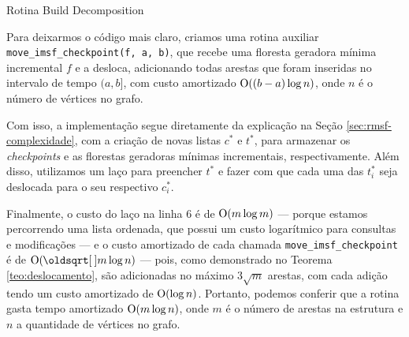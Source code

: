 \begin{algorithm}[h!]
    \caption{Rotina Build Decomposition}\label{rmsf-build-decomp}
    \begin{algorithmic}[1]

         
        \EndIf
        \EndFor

        \State {}

        \For{{i $\in [2, n\_blocks)$}}
        \EndFor
        \EndFunction
    \end{algorithmic}
\end{algorithm}

Para deixarmos o código mais claro, criamos uma rotina auxiliar \texttt{move\_imsf\_checkpoint(f, a, b)}, que recebe uma floresta geradora mínima incremental $f$ e a desloca, adicionando todas arestas que foram inseridas no intervalo de tempo $(a, b]$, com custo amortizado $\mathrm{O}((b-a) \log n)$, onde $n$ é o número de vértices no grafo.

Com isso, a implementação segue diretamente da explicação na Seção \ref{sec:rmsf-complexidade}, com a criação de novas listas $c^*$ e $t^*$, para armazenar os \emph{checkpoints} e as florestas geradoras mínimas incrementais, respectivamente. Além disso, utilizamos um laço para preencher $t^*$ e fazer com que cada uma das $t^*_i$ seja deslocada para o seu respectivo $c_i^*$.

Finalmente, o custo do laço na linha 6 é de $\mathrm{O}(m \log m)$ --- porque estamos percorrendo uma lista ordenada, que possui um custo logarítmico para consultas e modificações --- e o custo amortizado de cada chamada \texttt{move\_imsf\_checkpoint} é de $\Oh(\sqrt{m} \log n)$ --- pois, como demonstrado no Teorema \ref{teo:deslocamento}, são adicionadas no máximo $3\sqrt{m}$ arestas, com cada adição tendo um custo amortizado de $\mathrm{O}(\log n)$. Portanto, podemos conferir que a rotina gasta tempo amortizado $\mathrm{O}(m \log n)$, onde $m$ é o número de arestas na estrutura e $n$ a quantidade de vértices no grafo.

